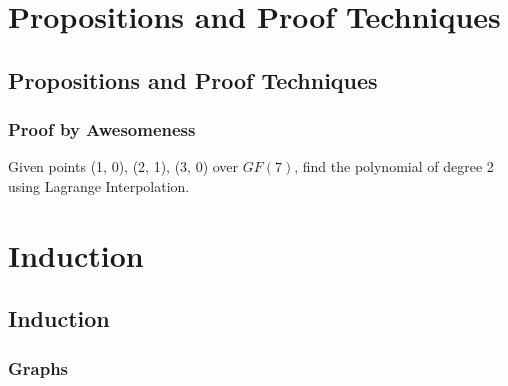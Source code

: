 \documentclass[9pt]{beamer}
\title{\themidterm}
\author{\theauthors}
\institute{\theorganization}
\date{\thedate}
\begin{document}

\begin{frame}[fragile]
  \titlepage
\end{frame}


\section{Propositions and Proof Techniques}
\subsection{Propositions and Proof Techniques}

\begin{frame}[fragile]
  \frametitle{Proof by Awesomeness}
Given points (1, 0), (2, 1), (3, 0) over $GF(7)$, find the polynomial of degree 2 using Lagrange Interpolation. \newline
{}
\end{frame}



\section{Induction}
\subsection{Induction}

\begin{frame}[fragile]
  \frametitle{Graphs}
\end{frame}


\end{document}
